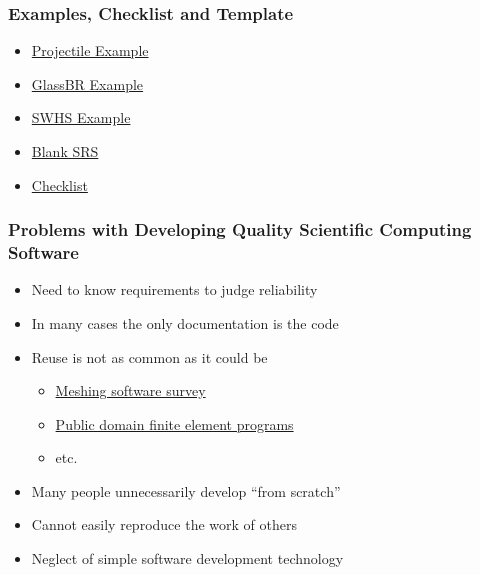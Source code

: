 \documentclass[t,12pt,numbers,fleqn]{beamer}
\begin{document}

\begin{frame}

\frametitle{Examples, Checklist and Template}

\begin{itemize}

\item
  \href{https://jacquescarette.github.io/Drasil/examples/Projectile/srs/Projectile_SRS.html}
  {Projectile Example}
\item
  \href{https://jacquescarette.github.io/Drasil/examples/GlassBR/srs/GlassBR_SRS.html}
  {GlassBR Example}
\item
  \href{https://jacquescarette.github.io/Drasil/examples/SWHS/srs/SWHS_SRS.html}
  {SWHS Example}
\item
  \href{https://gitlab.cas.mcmaster.ca/smiths/cas741/blob/master/BlankProjectTemplate/docs/SRS/SRS.pdf}
  {Blank SRS}
\item
  \href{https://gitlab.cas.mcmaster.ca/smiths/cas741/blob/master/BlankProjectTemplate/docs/SRS/SRS-Checklist.pdf} {Checklist}
\end{itemize}

\end{frame}


\begin{frame}

\frametitle{Problems with Developing Quality Scientific Computing Software}

\begin{itemize}

\item Need to know requirements to judge reliability
\item In many cases the only documentation is the code
\item Reuse is not as common as it could be
\begin{itemize}
\item \href{http://www.andrew.cmu.edu/user/sowen/softsurv.html}{\alert{Meshing software survey}}
\item \href{http://www.engr.usask.ca/~macphed/finite/fe_resources/node137.html}{\alert{Public domain finite element
programs}}
\item etc.
\end{itemize}
\item Many people unnecessarily develop ``from scratch''~\cite{Dubois2002}
\item Cannot easily reproduce the work of others
\item Neglect of simple software development technology~\cite{Wilson2006} 

\end{itemize}

\end{frame}
\end{document}
